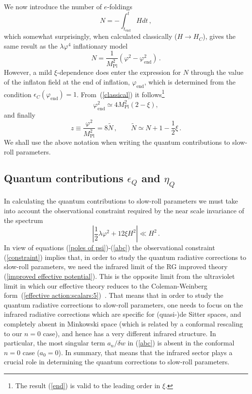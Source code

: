  We now introduce the number of $e$-foldings
\begin{equation}
N = -\int_{t_{\mathrm{end}}}^t H dt
\,,
\end{equation}
which somewhat surprisingly, when calculated classically
($H\rightarrow H_C$), gives the same result as the
${\lambda\varphi^4}$ inflationary model
\begin{equation}
N = \frac{1}{M_{\mathrm{Pl}}^2}\left(\varphi^2-
\varphi^2_{\mathrm{end}}\right)
\,.
\end{equation}
However, a mild $\xi$-dependence does enter the expression for $N$
through the value of the inflaton field at the end of inflation,
$\varphi_{\mathrm{end}}$, which is determined from the condition
$\epsilon_C(\varphi_{\mathrm{end}})=1$. From~(\ref{classical}) it
follows\footnote{The result (\ref{end}) is valid to the leading
order in $\xi$.}
\begin{equation}
\varphi^2_{\mathrm{end}} \simeq 4M^2_{\mathrm{Pl}}(2-\xi),\label{end}
\end{equation}
and finally
\begin{equation}
z\equiv \frac{\varphi^2}{M_{\mathrm{Pl}}^2} = 8\tilde{N}
\,,\qquad
\tilde{N}\simeq N+1-\frac12\xi
\,.
\label{z}
\end{equation}
We shall use the above notation when writing
the quantum contributions to slow-roll parameters.

\subsection{Quantum contributions $\epsilon_Q$ and $\eta_Q$}

In calculating the quantum contributions to slow-roll parameters we
must take into account the observational constraint required by
the near scale invariance of the spectrum
\begin{equation}
\left|\frac12\lambda\varphi^2+ 12\xi H^2 \right|\ll H^2\,.
\label{constraint}
\end{equation}
In view of equations (\ref{poles of psi})-(\ref{abc}) the
observational constraint (\ref{constraint}) implies that, in order
to study the quantum radiative corrections to slow-roll
parameters, we need the infrared limit of the RG improved theory
(\ref{improved effective potential}). This is the opposite limit
from the ultraviolet limit in which our effective theory reduces
to the Coleman-Weinberg form~(\ref{effective
action:scalars:5})~\cite{ColemanWeinberg:1973}. That means that in
order to study the quantum radiative corrections to slow-roll
parameters, one needs to focus on the infrared radiative
corrections which are specific for (quasi-)de Sitter spaces, and
completely absent in Minkowski space (which is related by a
conformal rescaling to our $n=0$ case), and hence has a very
different infrared structure. In particular, the most singular term
${a_n}/{\delta w}$ in (\ref{abc}) is absent in the conformal $n=0$
case ($a_0=0$). In summary, that means that the infrared sector plays a
crucial role in determining the quantum corrections to slow-roll
parameters.

